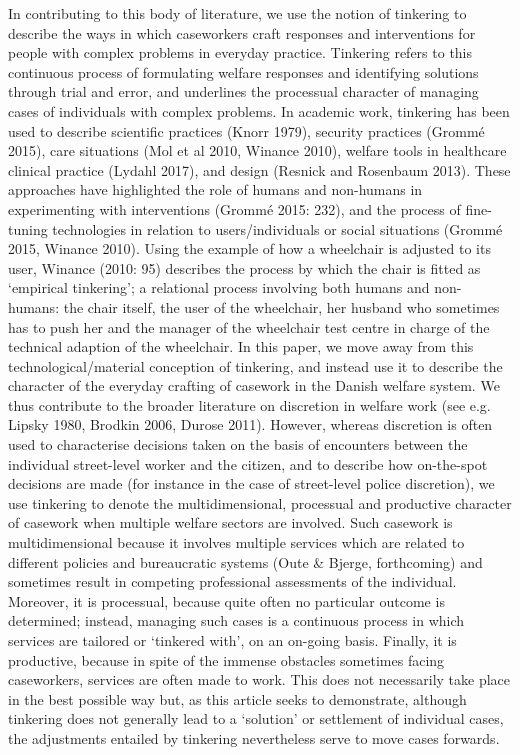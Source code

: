 In contributing to this body of literature, we use the notion of tinkering to describe the ways in which caseworkers craft responses and interventions for people with complex problems in everyday practice. Tinkering refers to this continuous process of formulating welfare responses and identifying solutions through trial and error, and underlines the processual character of managing cases of individuals with complex problems. In academic work, tinkering has been used to describe scientific practices (Knorr 1979), security practices (Grommé 2015), care situations (Mol et al 2010, Winance 2010), welfare tools in healthcare clinical practice (Lydahl 2017), and design (Resnick and Rosenbaum 2013). These approaches have highlighted the role of humans and non-humans in experimenting with interventions (Grommé 2015: 232), and the process of fine-tuning technologies in relation to users/individuals or social situations (Grommé 2015, Winance 2010). Using the example of how a wheelchair is adjusted to its user, Winance (2010: 95) describes the process by which the chair is fitted as ‘empirical tinkering’; a relational process involving both humans and non-humans: the chair itself, the user of the wheelchair, her husband who sometimes has to push her and the manager of the wheelchair test centre in charge of the technical adaption of the wheelchair. In this paper, we move away from this technological/material conception of tinkering, and instead use it to describe the character of the everyday crafting of casework in the Danish welfare system. We thus contribute to the broader literature on discretion in welfare work (see e.g. Lipsky 1980, Brodkin 2006, Durose 2011). However, whereas discretion is often used to characterise decisions taken on the basis of encounters between the individual street-level worker and the citizen, and to describe how on-the-spot decisions are made (for instance in the case of street-level police discretion), we use tinkering to denote the multidimensional, processual and productive character of casework when multiple welfare sectors are involved. Such casework is multidimensional because it involves multiple services which are related to different policies and bureaucratic systems (Oute \& Bjerge, forthcoming) and sometimes result in competing professional assessments of the individual. Moreover, it is processual, because quite often no particular outcome is determined; instead, managing such cases is a continuous process in which services are tailored or ‘tinkered with’, on an on-going basis. Finally, it is productive, because in spite of the immense obstacles sometimes facing caseworkers, services are often made to work. This does not necessarily take place in the best possible way but, as this article seeks to demonstrate, although tinkering does not generally lead to a ‘solution’ or settlement of individual cases, the adjustments entailed by tinkering nevertheless serve to move cases forwards.

